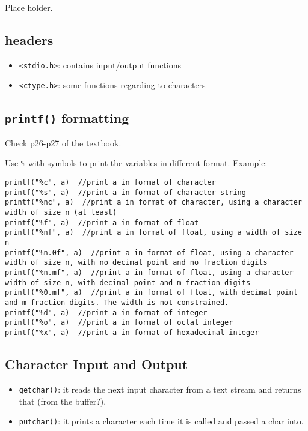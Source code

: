 \documentclass[12pt]{article}
\begin{document}
Place holder.

\subsection{headers}
\label{sec:orgcf5f852}
\begin{itemize}
\item \texttt{<stdio.h>}: contains input/output functions
\item \texttt{<ctype.h>}: some functions regarding to characters
\end{itemize}

\subsection{\texttt{printf()} formatting}
\label{sec:org7dfd776}
Check p26-p27 of the textbook.

Use \texttt{\%} with symbols to print the variables in different format.
Example:
\begin{verbatim}
printf("%c", a)  //print a in format of character
printf("%s", a)  //print a in format of character string
printf("%nc", a)  //print a in format of character, using a character width of size n (at least)
printf("%f", a)  //print a in format of float
printf("%nf", a)  //print a in format of float, using a width of size n
printf("%n.0f", a)  //print a in format of float, using a character width of size n, with no decimal point and no fraction digits
printf("%n.mf", a)  //print a in format of float, using a character width of size n, with decimal point and m fraction digits
printf("%0.mf", a)  //print a in format of float, with decimal point and m fraction digits. The width is not constrained.
printf("%d", a)  //print a in format of integer
printf("%o", a)  //print a in format of octal integer
printf("%x", a)  //print a in format of hexadecimal integer
\end{verbatim}
\subsection{Character Input and Output}
\label{sec:org07cf618}
\begin{itemize}
\item \texttt{getchar()}: it reads the next input character from a text stream and returns that (from the buffer?).
\item \texttt{putchar()}: it prints a character each time it is called and passed a char into.
\end{itemize}
\end{document}
